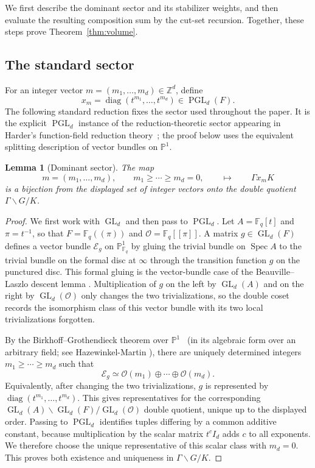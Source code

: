 \documentclass[11pt]{amsart}
\newcommand{\Fq}{\mathbb F_q}
\newcommand{\OO}{\mathcal O}
\newcommand{\ZZ}{\mathbb Z}
\newcommand{\GL}{\operatorname{GL}}
\newcommand{\PGL}{\operatorname{PGL}}
\newcommand{\diag}{\operatorname{diag}}
\theoremstyle{plain}
\newtheorem{lemma}[theorem]{Lemma}
\theoremstyle{definition}
\numberwithin{equation}{section}
\begin{document}
We first describe the dominant sector and its stabilizer weights, and then evaluate
the resulting composition sum by the cut-set recursion.  Together, these steps prove
Theorem~\ref{thm:volume}.

\subsection{The standard sector}

For an integer vector $m=(m_1,\ldots,m_d)\in\ZZ^d$, define
\[
  x_m=\diag(t^{m_1},\ldots,t^{m_d})\in\PGL_d(F).
\]
The following standard reduction fixes the sector used throughout the paper.
It is the explicit \(\PGL_d\) instance of the reduction-theoretic sector appearing in
Harder's function-field reduction theory~\cite{HarderReduction}; the proof below uses the
equivalent splitting description of vector bundles on \(\mathbb P^1\).


\begin{lemma}[Dominant sector]\label{lem:dominant-sector}
The map
\begin{equation}\label{eq:dominant-m}
  m=(m_1,\ldots,m_d),\qquad m_1\ge\cdots\ge m_d=0,
  \qquad\longmapsto\qquad \Gamma x_mK
\end{equation}
is a bijection from the displayed set of integer vectors onto the double quotient
$\Gamma\backslash G/K$.
\end{lemma}

\begin{proof}
We first work with $\GL_d$ and then pass to $\PGL_d$.  Let $A=\Fq[t]$ and
$\pi=t^{-1}$, so that $F=\Fq(\!(\pi)\!)$ and $\OO=\Fq[\![\pi]\!]$.  A matrix
$g\in\GL_d(F)$ defines a vector bundle $\mathcal E_g$ on $\mathbb P^1_{\Fq}$ by gluing the
trivial bundle on $\operatorname{Spec}A$ to the trivial bundle on the formal disc at
$\infty$ through the transition function $g$ on the punctured disc. This formal
gluing is the vector-bundle case of the Beauville--Laszlo descent lemma
\cite{BeauvilleLaszlo}. Multiplication of $g$
on the left by $\GL_d(A)$ and on the right by $\GL_d(\OO)$ only changes the two
trivializations, so the double coset records the isomorphism class of this vector bundle
with its two local trivializations forgotten.

By the Birkhoff--Grothendieck theorem over $\mathbb P^1$~\cite{Grothendieck}
(in its algebraic form over an arbitrary field; see Hazewinkel-Martin \cite{HazewinkelMartin}), there are uniquely determined
integers $m_1\ge\cdots\ge m_d$ such that
\[
  \mathcal E_g\simeq \mathcal O(m_1)\oplus\cdots\oplus\mathcal O(m_d).
\]
Equivalently, after changing the two trivializations, $g$ is represented by
$\diag(t^{m_1},\ldots,t^{m_d})$.  This gives representatives for the corresponding
$\GL_d(A)\backslash\GL_d(F)/\GL_d(\OO)$ double quotient, unique up to the displayed order.
Passing to $\PGL_d$ identifies tuples differing by a common additive constant, because
multiplication by the scalar matrix $t^c I_d$ adds $c$ to all exponents.  We therefore choose
the unique representative of this scalar class with $m_d=0$.  This proves both existence and
uniqueness in $\Gamma\backslash G/K$.
\end{proof}
\end{document}
